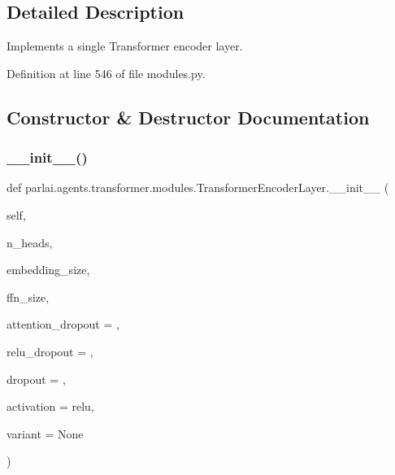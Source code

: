 \subsection{Detailed Description}
\begin{DoxyVerb}Implements a single Transformer encoder layer.
\end{DoxyVerb}
 

Definition at line 546 of file modules.\+py.



\subsection{Constructor \& Destructor Documentation}
\mbox{\label{classparlai_1_1agents_1_1transformer_1_1modules_1_1TransformerEncoderLayer_a68caa3f119bfb946e34b7cf3c8bd9e48}} 
\subsubsection{\texorpdfstring{\+\_\+\+\_\+init\+\_\+\+\_\+()}{\_\_init\_\_()}}
{\footnotesize\ttfamily def parlai.\+agents.\+transformer.\+modules.\+Transformer\+Encoder\+Layer.\+\_\+\+\_\+init\+\_\+\+\_\+ (\begin{DoxyParamCaption}\item[{}]{self,  }\item[{}]{n\+\_\+heads,  }\item[{}]{embedding\+\_\+size,  }\item[{}]{ffn\+\_\+size,  }\item[{}]{attention\+\_\+dropout = {},  }\item[{}]{relu\+\_\+dropout = {},  }\item[{}]{dropout = {},  }\item[{}]{activation = {\ttfamily \textquotesingle{}relu\textquotesingle{}},  }\item[{}]{variant = {\ttfamily None} }\end{DoxyParamCaption})}



